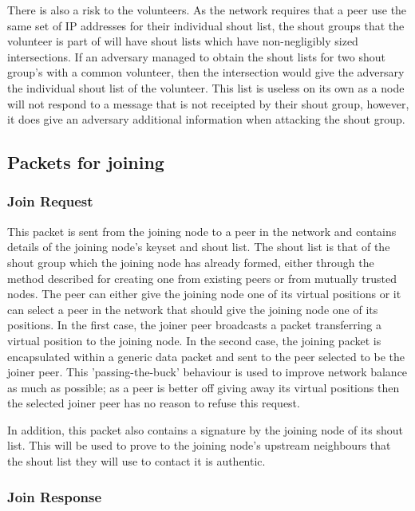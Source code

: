 \documentclass[ %
                    author={Luke Murray},
                supervisor={Dr. Simon Hollis},
                     title={Shadow Peer-to-Peer Networks},
                  subtitle={},
                    degree={MEng},
                      year={2013} ]{thesis}
\begin{document}
There is also a risk to the volunteers. As the network requires that a peer use the same set of IP addresses for their individual shout list, the shout groups that the volunteer is part of will have shout lists which have non-negligibly sized intersections. If an adversary managed to obtain the shout lists for two shout group's with a common volunteer, then the intersection would give the adversary the individual shout list of the volunteer. This list is useless on its own as a node will not respond to a message that is not receipted by their shout group, however, it does give an adversary additional information when attacking the shout group.

\subsection{Packets for joining}

\subsubsection{Join Request}

This packet is sent from the joining node to a peer in the network and contains details of the joining node's keyset and shout list. The shout list is that of the shout group which the joining node has already formed, either through the method described for creating one from existing peers or from mutually trusted nodes. The peer can either give the joining node one of its virtual positions or it can select a peer in the network that should give the joining node one of its positions. In the first case, the joiner peer broadcasts a packet transferring a virtual position to the joining node. In the second case, the joining packet is encapsulated within a generic data packet and sent to the peer selected to be the joiner peer. This 'passing-the-buck' behaviour is used to improve network balance as much as possible; as a peer is better off giving away its virtual positions then the selected joiner peer has no reason to refuse this request.

In addition, this packet also contains a signature by the joining node of its shout list. This will be used to prove to the joining node's upstream neighbours that the shout list they will use to contact it is authentic.

\subsubsection{Join Response}
\end{document}
